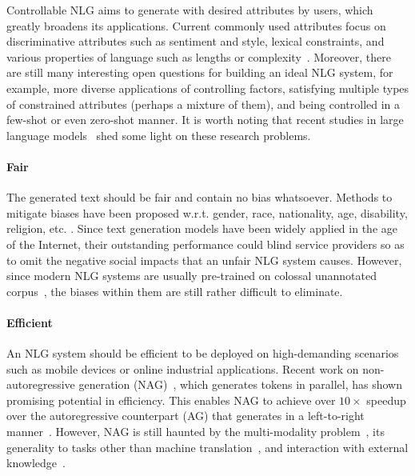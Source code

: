 Controllable NLG aims to generate with desired attributes by users, which greatly broadens its applications.
Current commonly used attributes focus on discriminative attributes such as sentiment and style, lexical constraints, and various properties of language such as lengths or complexity~\cite{NEURIPS2021_d0f5edad,zhang2022survey,garbacea2022constrained}.
Moreover, there are still many interesting open questions for building an ideal NLG system, for example, more diverse applications of controlling factors, satisfying multiple types of constrained attributes (perhaps a mixture of them), and being controlled in a few-shot or even zero-shot manner.
It is worth noting that recent studies in large language models~\cite{NEURIPS2020_1457c0d6} shed some light on these research problems.


\paragraph{Fair}

The generated text should be fair and contain no bias whatsoever.
Methods to mitigate biases have been proposed w.r.t. gender, race, nationality, age, disability, religion, etc.
\cite{liu-etal-2020-gender,xia-etal-2020-demoting,gupta-etal-2022-mitigating}.
Since text generation models have been widely applied in the age of the Internet, their outstanding performance could blind service providers so as to omit the negative social impacts that an unfair NLG system causes.
However, since modern NLG systems are usually pre-trained on colossal unannotated corpus~\cite{radford2019language,raffel2020exploring,lewis-etal-2020-bart,NEURIPS2020_1457c0d6}, the biases within them are still rather difficult to eliminate.



\paragraph{Efficient}

An NLG system should be efficient to be deployed on high-demanding scenarios such as mobile devices or online industrial applications.
Recent work on non-autoregressive generation (NAG)~\cite{gu2018nonautoregressive,xiao2022survey}, which generates tokens in parallel, has shown promising potential in efficiency.
This enables NAG to achieve over $10\times$ speedup over the autoregressive counterpart (AG) that generates in a left-to-right manner~\cite{vaswani2017attention}.
However, NAG is still haunted by the multi-modality problem~\cite{Zhou2020Understanding}, its generality to tasks other than machine translation~\cite{qian-etal-2021-glancing}, and interaction with external knowledge~\cite{zeng-etal-2022-neighbors}.


